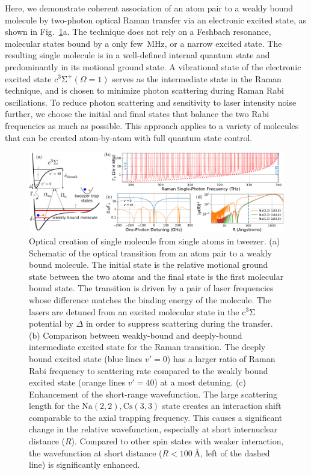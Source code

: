 \documentclass[aps,prl,twocolumn,10pt,superscriptaddress]{revtex4-1}
\newcommand{\Na}{\mathrm{Na}}
\newcommand{\Cs}{\mathrm{Cs}}
\begin{document}
Here, we demonstrate coherent association of an atom pair to a weakly bound molecule
by two-photon optical Raman transfer via an electronic excited state,
as shown in Fig.~\ref{f-theory}a.
The technique does not rely on a Feshbach resonance,
molecular states bound by a only few~MHz, or a narrow excited state.
The resulting single molecule is in a well-defined internal quantum state
and predominantly in its motional ground state.
A vibrational state of the electronic excited state $\mathrm{c^3\Sigma^+}(\Omega = 1)$
serves as the intermediate state in the Raman technique,
and is chosen to minimize photon scattering during Raman Rabi oscillations.
To reduce photon scattering and sensitivity to laser intensity noise further,
we choose the initial and final states that balance the two Rabi frequencies as much as possible.
This approach applies to a variety of molecules that can be created atom-by-atom with full quantum state control.


\begin{figure}
  \includegraphics[width=\textwidth]{imgs/fig-theory.pdf}
  \caption{Optical creation of single molecule from single atoms in tweezer.
    (a) Schematic of the optical transition from an atom pair to a weakly bound molecule.
    The initial state is the relative motional ground state between the two atoms
    and the final state is the first molecular bound state.
    The transition is driven by a pair of laser frequencies whose difference matches the binding energy
    of the molecule.
    The lasers are detuned from an excited molecular state in the $\mathrm{c^3\Sigma}$ potential
    by $\Delta$ in order to suppress scattering during the transfer.
    (b) Comparison between weakly-bound and deeply-bound intermediate excited state
    for the Raman transition.
    The deeply bound excited state (blue lines $v'=0$)
    has a larger ratio of Raman Rabi frequency to scattering rate
    compared to the weakly bound excited state (orange lines $v'=40$) at a most detuning.
    (c) Enhancement of the short-range wavefunction.
    The large scattering length for the $\Na(2,2),\Cs(3,3)$ state creates an interaction shift
    comparable to the axial trapping frequency.
    This causes a significant change in the relative wavefunction, especially at short
    internuclear distance ($R$).
    Compared to other spin states with weaker interaction,
    the wavefunction at short distance ($R<100\ \text{\AA}$, left of the dashed line)
    is significantly enhanced.
    \label{f-theory}
  }
\end{figure}
\end{document}
